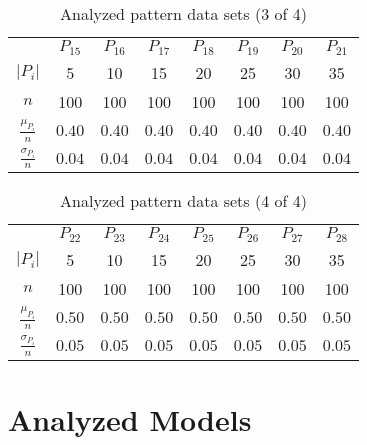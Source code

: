 \documentclass[12pt]{article}
\begin{document}
\begin{appendices}
        \begin{table}[H]
        \centering
        \def\arraystretch{1.5}
        \begin{tabular}{cccccccc}
        
 & $P_{15}$  & $P_{16}$  & $P_{17}$  & $P_{18}$  & $P_{19}$  & $P_{20}$  & $P_{21}$  \\ \cline{2-8}
$\left|P_i\right|$  & 5  & 10  & 15  & 20  & 25  & 30  & 35 \\
$n$  & 100  & 100  & 100  & 100  & 100  & 100  & 100 \\
$\frac{\mu_{P_i}}{n}$  & $0.40$  & $0.40$  & $0.40$  & $0.40$  & $0.40$  & $0.40$  & $0.40$ \\
$\frac{\sigma_{P_i}}{n}$  & $0.04$  & $0.04$  & $0.04$  & $0.04$  & $0.04$  & $0.04$  & $0.04$ 
        \end{tabular}
        \caption{Analyzed pattern data sets (3 of 4)}
        \end{table}
        

        \begin{table}[H]
        \centering
        \def\arraystretch{1.5}
        \begin{tabular}{cccccccc}
        
 & $P_{22}$  & $P_{23}$  & $P_{24}$  & $P_{25}$  & $P_{26}$  & $P_{27}$  & $P_{28}$  \\ \cline{2-8}
$\left|P_i\right|$  & 5  & 10  & 15  & 20  & 25  & 30  & 35 \\
$n$  & 100  & 100  & 100  & 100  & 100  & 100  & 100 \\
$\frac{\mu_{P_i}}{n}$  & $0.50$  & $0.50$  & $0.50$  & $0.50$  & $0.50$  & $0.50$  & $0.50$ \\
$\frac{\sigma_{P_i}}{n}$  & $0.05$  & $0.05$  & $0.05$  & $0.05$  & $0.05$  & $0.05$  & $0.05$ 
        \end{tabular}
        \caption{Analyzed pattern data sets (4 of 4)}
        \end{table}
        
\section{Analyzed Models}

    


\end{appendices}
\end{document}
